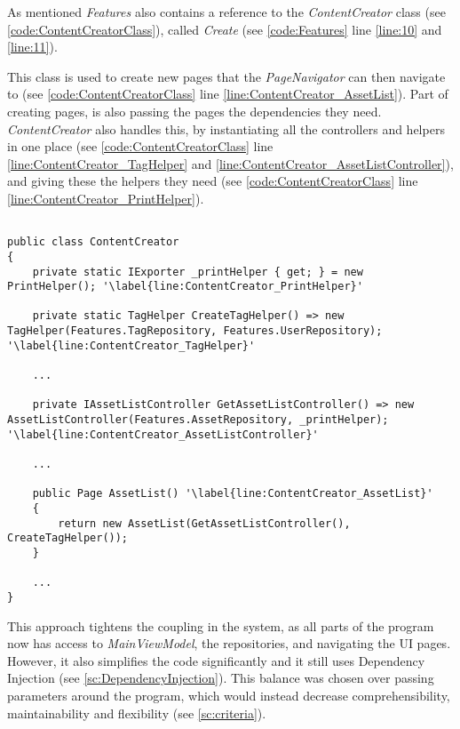 As mentioned \textit{Features} also contains a reference to the \textit{ContentCreator} class (see \autoref{code:ContentCreatorClass}), called \textit{Create} (see \autoref{code:Features} line \ref{line:10} and \ref{line:11}).
\par
This class is used to create new pages that the \textit{PageNavigator} can then navigate to (see \autoref{code:ContentCreatorClass} line \ref{line:ContentCreator_AssetList}). Part of creating pages, is also passing the pages the dependencies they need. \textit{ContentCreator} also handles this, by instantiating all the controllers and helpers in one place (see \autoref{code:ContentCreatorClass} line \ref{line:ContentCreator_TagHelper} and \ref{line:ContentCreator_AssetListController}), and giving these the helpers they need (see \autoref{code:ContentCreatorClass} line \ref{line:ContentCreator_PrintHelper}).

\begin{listing}[H]
\begin{verbatim}

public class ContentCreator 
{
    private static IExporter _printHelper { get; } = new PrintHelper(); '\label{line:ContentCreator_PrintHelper}'
    
    private static TagHelper CreateTagHelper() => new TagHelper(Features.TagRepository, Features.UserRepository); '\label{line:ContentCreator_TagHelper}'
    
    ...

    private IAssetListController GetAssetListController() => new AssetListController(Features.AssetRepository, _printHelper); '\label{line:ContentCreator_AssetListController}'
    
    ...
    
    public Page AssetList() '\label{line:ContentCreator_AssetList}'
    {
        return new AssetList(GetAssetListController(), CreateTagHelper());
    }
    
    ...
}

\end{verbatim}
\label{code:ContentCreatorClass}
\end{listing}

This approach tightens the coupling in the system, as all parts of the program now has access to \textit{MainViewModel}, the repositories, and navigating the UI pages. However, it also simplifies the code significantly and it still uses Dependency Injection (see \autoref{sc:DependencyInjection}). This balance was chosen over passing parameters around the program, which would instead decrease comprehensibility, maintainability and flexibility (see \autoref{sc:criteria}).
